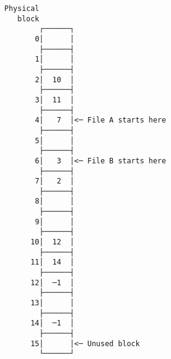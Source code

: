 \documentclass[varwidth=50em,crop]{standalone}
\begin{document}
\begin{verbatim}
Physical
   block
        ┌──────┐
       0│      │
        ├──────┤
       1│      │
        ├──────┤
       2│  10  │
        ├──────┤
       3│  11  │
        ├──────┤
       4│   7  │<─ File A starts here
        ├──────┤
       5│      │
        ├──────┤
       6│   3  │<─ File B starts here
        ├──────┤
       7│   2  │
        ├──────┤
       8│      │
        ├──────┤
       9│      │
        ├──────┤
      10│  12  │
        ├──────┤
      11│  14  │
        ├──────┤
      12│  ─1  │
        ├──────┤
      13│      │
        ├──────┤
      14│  ─1  │
        ├──────┤
      15│      │<─ Unused block
        └──────┘
\end{verbatim}
\end{document}
